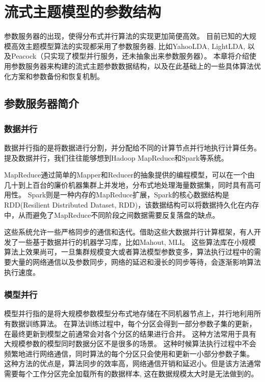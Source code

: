 \chapter{流式主题模型的参数结构}
\label{chapter:parameter}
参数服务器的出现，使得分布式并行算法的实现更加简便高效。
目前已知的大规模高效主题模型算法的实现都采用了参数服务器\cite{li2014scaling}, 
比如YahooLDA\cite{ahmed2012scalable}, LightLDA\cite{yuan2015lightlda}, 以及Peacock\cite{li2014scaling}（只实现了模型并行服务，还未抽象出来参数服务器）。
本章将介绍使用参数服务器来构建的流式主题参数数据结构，以及在此基础上的一些具体算法优化方案和参数备份和恢复机制。

\section{参数服务器简介}
\subsection{数据并行}
数据并行指的是将数据进行分割，并分配给不同的计算节点并行地执行计算任务。
提及数据并行，我们往往能够想到Hadoop MapReduce和Spark等系统。

MapReduce通过简单的Mapper和Reducer的抽象提供的编程模型，可以在一个由几十到上百台的廉价机器集群上并发地，分布式地处理海量数据集，同时具有高可用性。
Spark则是一种内存的MapReduce扩展，Spark的核心数据结构是RDD(Resilient Distributed Dataset, RDD)，该数据结构可以将数据持久化在内存中，从而避免了MapReduce不同阶段之间数据需要反复落盘的缺点。

这些系统允许一些严格同步的通信和迭代。借助这些大数据并行计算框架，有人开发了一些基于数据并行的机器学习库，比如Mahout\cite{mahout}, MLI\cite{sparks2013mli}。
这些算法库在小规模算法上效果尚可，一旦集群规模变大或者算法模型参数变多，算法执行过程中的需要大量的网络通信以及参数同步，网络的延迟和漫长的同步等待，会逐渐影响算法执行速度。

\subsection{模型并行}
模型并行指的是将大规模参数模型分布式地存储在不同机器节点上，并行地利用所有数据训练算法。
在算法训练过程中，每个分区会得到一部分参数子集的更新，在最终更新到模型之前通常会对各个分区的结果进行合并。
这种方法常用于具有大规模参数的模型同时数据分区不是很多的场景。
这种时候算法执行过程中不会频繁地进行网络通信，同时算法的每个分区只会使用和更新一小部分参数子集。
这种方法的优点是，算法同步的效率高，网络通信开销和延迟小。但是该方法通常需要每个工作分区完全加载所有的数据样本, 这在数据规模太大时是无法做到的。

